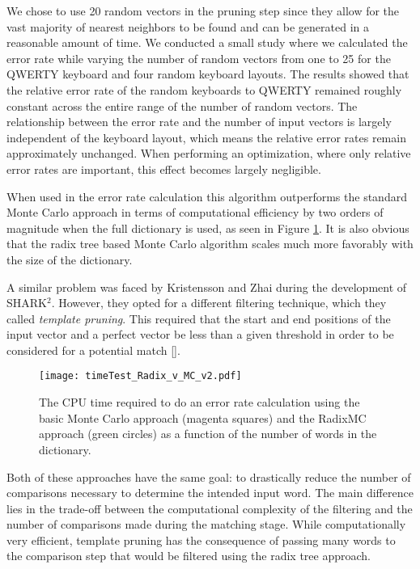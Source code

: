 \documentclass[final,1p,times,authoryear]{elsarticle}
\begin{document}
We chose to use 20 random vectors in the pruning step since they allow for the vast majority of nearest neighbors to be found and can be generated in a reasonable amount of time.
We conducted a small study where we calculated the error rate while varying the number of random vectors from one to 25 for the QWERTY keyboard and four random keyboard layouts.
The results showed that the relative error rate of the random keyboards to QWERTY remained roughly constant across the entire range of the number of random vectors.
The relationship between the error rate and the number of input vectors is largely independent of the keyboard layout, which means the relative error rates remain approximately unchanged.
When performing an optimization, where only relative error rates are important, this effect becomes largely negligible.

When used in the error rate calculation this algorithm outperforms the standard Monte Carlo approach in terms of computational efficiency by two orders of magnitude when the full dictionary is used, as seen in Figure \ref{fig:The-cpu-time}.
It is also obvious that the radix tree based Monte Carlo algorithm scales much more favorably with the size of the dictionary.

A similar problem was faced by Kristensson and Zhai during the development of SHARK$^2$.
However, they opted for a different filtering technique, which they called \textit{template pruning}.
This required that the start and end positions of the input vector and a perfect vector be less than a given threshold in order to be considered for a potential match [\cite{SHARK2}].

\begin{figure}[t]
\begin{centering}
\texttt{[image: timeTest\_Radix\_v\_MC\_v2.pdf]}
\par\end{centering}
\smallskip{}
\protect\caption{The CPU time required to do an error rate calculation using the basic
Monte Carlo approach (magenta squares) and the RadixMC approach (green circles) as
a function of the number of words in the dictionary.\label{fig:The-cpu-time}}
\end{figure}

Both of these approaches have the same goal: to drastically reduce the number of comparisons necessary to determine the intended input word.
The main difference lies in the trade-off between the computational complexity of the filtering and the number of comparisons made during the matching stage.
While computationally very efficient, template pruning has the consequence of passing many words to the comparison step that would be filtered using the radix tree approach.
\end{document}
